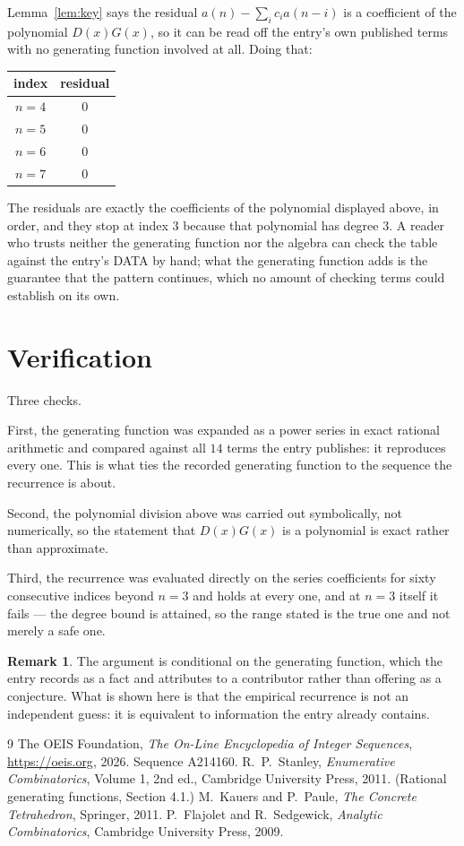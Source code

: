 \documentclass[11pt,a4paper]{article}
\theoremstyle{plain}
\theoremstyle{definition}
\newtheorem{remark}[theorem]{Remark}
\begin{document}
Lemma~\ref{lem:key} says the residual $a(n)-\sum_ic_ia(n-i)$ is a coefficient of the
polynomial $D(x)G(x)$, so it can be read off the entry's own published terms with no
generating function involved at all. Doing that:
\begin{center}
\begin{tabular}{cc}
index & residual \\ \hline
$n=4$ & $0$ \\
$n=5$ & $0$ \\
$n=6$ & $0$ \\
$n=7$ & $0$
\end{tabular}
\end{center}
The residuals are exactly the coefficients of the polynomial displayed above, in order, and
they stop at index $3$ because that polynomial has degree $3$. A reader who trusts
neither the generating function nor the algebra can check the table against the entry's DATA
by hand; what the generating function adds is the guarantee that the pattern continues, which
no amount of checking terms could establish on its own.

\section{Verification}

Three checks.

First, the generating function was expanded as a power series in exact rational arithmetic and
compared against all $14$ terms the entry publishes: it reproduces every one. This is
what ties the recorded generating function to the sequence the recurrence is about.

Second, the polynomial division above was carried out symbolically, not numerically, so the
statement that $D(x)G(x)$ is a polynomial is exact rather than approximate.

Third, the recurrence was evaluated directly on the series coefficients for sixty consecutive
indices beyond $n=3$ and holds at every one, and at $n=3$ itself it fails --- the
degree bound is attained, so the range stated is the true one and not merely a safe one.

\begin{remark}
The argument is conditional on the generating function, which the entry records as a fact and
attributes to a contributor rather than offering as a conjecture. What is shown here is that
the empirical recurrence is not an independent guess: it is equivalent to information the
entry already contains.
\end{remark}

\begin{thebibliography}{9}
 The OEIS Foundation, \emph{The On-Line Encyclopedia of Integer
Sequences}, \url{https://oeis.org}, 2026. Sequence A214160.
 R.~P.~Stanley, \emph{Enumerative Combinatorics}, Volume 1, 2nd ed.,
Cambridge University Press, 2011. (Rational generating functions, Section 4.1.)
 M.~Kauers and P.~Paule, \emph{The Concrete Tetrahedron}, Springer, 2011.
 P.~Flajolet and R.~Sedgewick, \emph{Analytic Combinatorics}, Cambridge
University Press, 2009.
\end{thebibliography}
\end{document}
